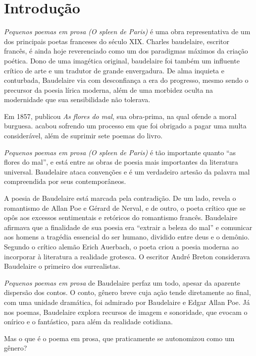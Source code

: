 \documentclass[12pt]{extarticle}
\begin{document}
\tableofcontents

\section{Introdução}

\textit{Pequenos poemas em prosa (O spleen de Paris)}
é uma obra representativa de um dos principais poetas franceses do
século XIX. Charles baudelaire, escritor francês, é ainda hoje reverenciado como um dos
paradigmas máximos da criação poética. Dono de uma imagética original,
baudelaire foi também um influente crítico de
arte e um tradutor de grande envergadura. De alma inquieta e conturbada, 
Baudelaire via com desconfiança a era do
progresso, mesmo sendo o precursor da poesia lírica moderna, 
além de uma morbidez oculta na modernidade que sua sensibilidade não tolerava.
 
Em 1857, publicou \textit{As flores do mal}, sua
obra-prima, na qual ofende a moral burguesa. acabou sofrendo um processo em
que foi obrigado a pagar uma multa considerável, além de suprimir sete poemas
do livro. 

\textit{Pequenos poemas em prosa (O spleen de Paris)} é tão importante quanto 
“as flores do mal”, e está entre as obras de poesia mais importantes da 
literatura universal. Baudelaire ataca convenções e é um verdadeiro artesão 
da palavra mal compreendida por seus contemporâneos. 

A poesia de Baudelaire está marcada pela
contradição. De um lado, revela o romantismo de Allan Poe e Gérard de Nerval, e
de outro, o poeta crítico que se opôs aos excessos sentimentais e retóricos do
romantismo francês.
Baudelaire afirmava que a finalidade de sua poesia era “extrair a beleza do
mal” e comunicar aos homens a tragédia essencial do ser humano, dividido entre
deus e o demônio.  Segundo o crítico alemão Erich Auerbach, o poeta criou a
poesia moderna ao incorporar à literatura a realidade grotesca. O escritor
André Breton considerava Baudelaire o primeiro dos surrealistas.
 
\textit{Pequenos poemas em prosa} de Baudelaire perfaz um todo, 
apesar da aparente dispersão dos contos. O conto, gênero breve cuja 
ação tende diretamente ao final, com uma unidade
dramática, foi admirado por Baudelaire e Edgar Allan Poe.
Já nos poemas, Baudelaire explora recursos de imagem e sonoridade, que evocam o
onírico e o fantástico, para além da realidade cotidiana.

Mas o que é o poema em prosa, que praticamente se autonomizou como um
gênero?
 
\end{document}
